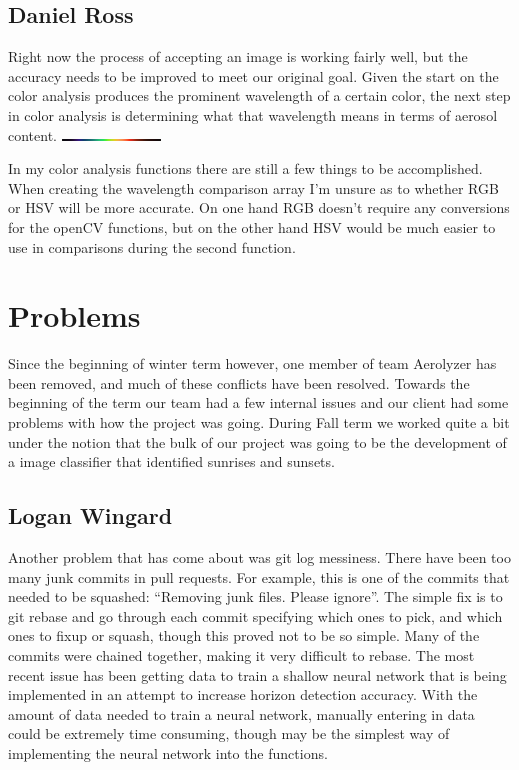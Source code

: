 \documentclass[onecolumn, draftclsnofoot,10pt, compsoc]{IEEEtran}
\begin{document}
\begin{singlespace}
		\subsection{Daniel Ross}
			Right now the process of accepting an image is working fairly well, but the accuracy needs to be improved to meet our original goal.
			Given the start on the color analysis produces the prominent wavelength of a certain color, the next step in color analysis is determining what that wavelength means in terms of aerosol content.
			\includegraphics[height=0.05cm,natwidth=370,natheight=7]{images/Visible_Color_Spectrum.png}
			
			In my color analysis functions there are still a few things to be accomplished.
			When creating the wavelength comparison array I'm unsure as to whether RGB or HSV will be more accurate.
			On one hand RGB doesn't require any conversions for the openCV functions, but on the other hand HSV would be much easier to use in comparisons during the second function.


	\section{Problems}
		Since the beginning of winter term however, one member of team Aerolyzer has been removed, and much of these conflicts have been resolved.
		Towards the beginning of the term our team had a few internal issues and our client had some problems with how the project was going.
		During Fall term we worked quite a bit under the notion that the bulk of our project was going to be the development of a image classifier that identified sunrises and sunsets.
		\subsection{Logan Wingard}
			Another problem that has come about was git log messiness.
			There have been too many junk commits in pull requests. 
			For example, this is one of the commits that needed to be squashed: ``Removing junk files. Please ignore''.
			The simple fix is to git rebase and go through each commit specifying which ones to pick, and which ones to fixup or squash, though this proved not to be so simple.
			Many of the commits were chained together, making it very difficult to rebase.
			The most recent issue has been getting data to train a shallow neural network that is being implemented in an attempt to increase horizon detection accuracy.
			With the amount of data needed to train a neural network, manually entering in data could be extremely time consuming, though may be the simplest way of implementing the neural network into the functions.

\end{singlespace}
\end{document}

